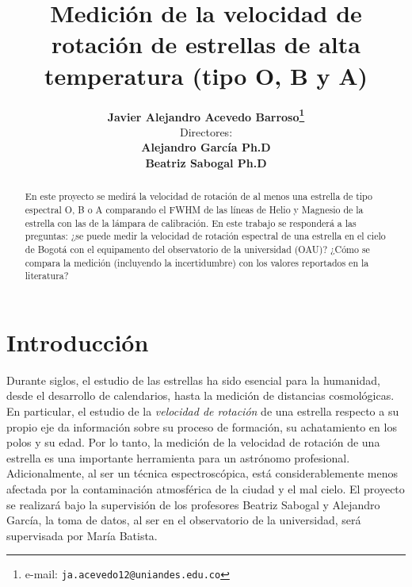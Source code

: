 \documentclass[notitlepage,letterpaper,12pt]{article} %
\begin{document}
\title{Medición de la velocidad de rotación de estrellas de alta temperatura (tipo O, B y A)}
\author{
\textbf{Javier Alejandro Acevedo Barroso\thanks{e-mail: \texttt{ja.acevedo12@uniandes.edu.co}}}\vspace{2mm} \\
Directores:\\
\textbf{Alejandro García Ph.D}\\
\textbf{Beatriz Sabogal Ph.D}
} %

\maketitle %


\vspace{-6mm}
\begin{abstract}
En este proyecto se medirá la velocidad de rotación de al menos una estrella de tipo espectral O, B o A comparando el FWHM de las líneas de Helio y Magnesio de la estrella con las de la lámpara de calibración.  En este trabajo se responderá a las preguntas: ¿se puede medir la velocidad de rotación espectral de una estrella en el cielo de Bogotá con el equipamento del observatorio de la universidad (OAU)? ¿Cómo se compara la medición (incluyendo la incertidumbre) con los valores reportados en la literatura?
\end{abstract} 
\section{Introducción} 
Durante siglos, el estudio de las estrellas ha sido esencial para la humanidad, desde el desarrollo de calendarios, hasta la medición de distancias cosmológicas. En particular, el estudio de la \emph{velocidad de rotación} de una estrella respecto a su propio eje da información sobre su proceso de formación, su achatamiento en los polos y su edad. Por lo tanto, la medición de la velocidad de rotación de una estrella es una importante herramienta para un astrónomo profesional. Adicionalmente, al ser un técnica espectroscópica, está considerablemente menos afectada por la contaminación atmosférica de la ciudad y el mal cielo. El proyecto se realizará bajo la supervisión de los profesores Beatriz Sabogal y Alejandro García, la toma de datos, al ser en el observatorio de la universidad, será supervisada por María Batista. 
\end{document}
